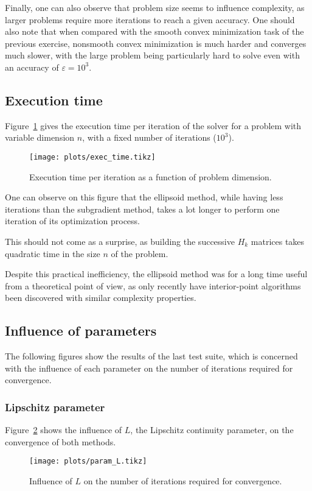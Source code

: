 \documentclass[final]{aomart}
\newtheorem[{}\it]{thm}{Theorem}[section]
\theoremstyle{definition}
\newtheorem*[{}\it]{notation}{Notation}
\numberwithin{equation}{section}
\renewcommand{\epsilon}{\varepsilon}
\begin{document}
Finally, one can also observe that problem size seems to influence complexity, as larger problems require more iterations to reach a given accuracy.
One should also note that when compared with the smooth convex minimization task of the previous exercise, nonsmooth convex minimization is much harder and converges much slower, with the large problem being particularly hard to solve even with an accuracy of \(\epsilon = 10^3\).

\subsection{Execution time}
\label{sec:exec_time}
Figure~\ref{fig:exec_time} gives the execution time per iteration of the solver for a problem with variable dimension \(n\), with a fixed number of iterations (\(10^3\)).
\begin{figure}[H]
	\centering
	\texttt{[image: plots/exec\_time.tikz]}
	\caption{Execution time per iteration as a function of problem dimension.}
	\label{fig:exec_time}
\end{figure}

One can observe on this figure that the ellipsoid method, while having less iterations than the subgradient method, takes a lot longer to perform one iteration of its optimization process.

This should not come as a surprise, as building the successive \(H_k\) matrices takes quadratic time in the size \(n\) of the problem.

Despite this practical inefficiency, the ellipsoid method was for a long time useful from a theoretical point of view, as only recently have interior-point algorithms been discovered with similar complexity properties.~\cite{GLS1993}

\subsection{Influence of parameters}
\label{sec:param_tests}
The following figures show the results of the last test suite, which is concerned with the influence of each parameter on the number of iterations required for convergence.

\subsubsection{Lipschitz parameter}
\label{sec:param_L}
Figure~\ref{fig:param_L} shows the influence of \(L\), the Lipschitz continuity parameter, on the convergence of both methods.
\begin{figure}[H]
	\centering
	\texttt{[image: plots/param\_L.tikz]}
	\caption{Influence of \(L\) on the number of iterations required for convergence.}
	\label{fig:param_L}
\end{figure}
\end{document}
